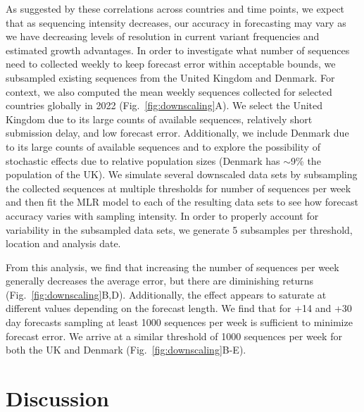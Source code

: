 \documentclass[11pt,oneside,letterpaper]{article}
\begin{document}
As suggested by these correlations across countries and time points, we expect that as sequencing intensity decreases, our accuracy in forecasting may vary as we have decreasing levels of resolution in current variant frequencies and estimated growth advantages.
In order to investigate what number of sequences need to collected weekly to keep forecast error within acceptable bounds, we subsampled existing sequences from the United Kingdom and Denmark.
For context, we also computed the mean weekly sequences collected for selected countries globally in 2022 (Fig.~\ref{fig:downscaling}A).
We select the United Kingdom due to its large counts of available sequences, relatively short submission delay, and low forecast error.
Additionally, we include Denmark due to its large counts of available sequences and to explore the possibility of stochastic effects due to relative population sizes (Denmark has $\sim$9\% the population of the UK).
We simulate several downscaled data sets by subsampling the collected sequences at multiple thresholds for number of sequences per week and then fit the MLR model to each of the resulting data sets to see how forecast accuracy varies with sampling intensity.
In order to properly account for variability in the subsampled data sets, we generate 5 subsamples per threshold, location and analysis date.

From this analysis, we find that increasing the number of sequences per week generally decreases the average error, but there are diminishing returns (Fig.~\ref{fig:downscaling}B,D).
Additionally, the effect appears to saturate at different values depending on the forecast length.
We find that for +14 and +30 day forecasts sampling at least 1000 sequences per week is sufficient to minimize forecast error.
We arrive at a similar threshold of 1000 sequences per week for both the UK and Denmark (Fig.~\ref{fig:downscaling}B-E).




\section*{Discussion}

\end{document}
